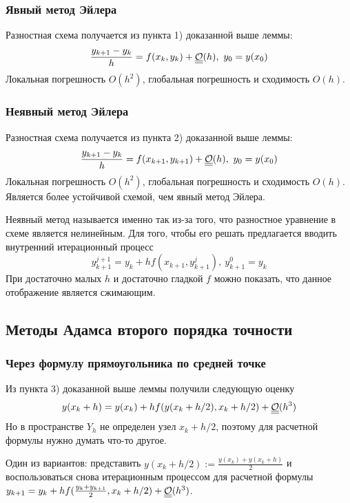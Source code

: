 \subsubsection*{Явный метод Эйлера}
Разностная схема получается из пункта 1) доказанной выше леммы:
\[\frac{y_{k+1}-y_k}{h}= f(x_k,y_k) + \bigO(h),\ y_0=y(x_0)\]
Локальная погрешность $O(h^2)$, глобальная погрешность и сходимость $O(h)$.

\subsubsection*{Неявный метод Эйлера}
Разностная схема получается из пункта 2) доказанной выше леммы:
\[\frac{y_{k+1}-y_k}{h}= f(x_{k+1},y_{k+1}) + \underline{\underline{\mathcal{O}}}(h),\ y_0=y(x_0)\]
Локальная погрешность $O(h^2)$, глобальная погрешность и сходимость $O(h)$.
Является более устойчивой схемой, чем явный метод Эйлера.

Неявный метод называется именно так из-за того, что разностное уравнение
в схеме является нелинейным. Для того, чтобы его решать предлагается
вводить внутренний итерационный процесс
\[y_{k+1}^{j+1}= y_k+hf(x_{k+1},y_{k+1}^{j}),\ y_{k+1}^{0}=y_{k}\]
При достаточно малых $h$ и достаточно гладкой $f$ можно показать,
что данное отображение является сжимающим.

\subsection*{Методы Адамса второго порядка точности}

\subsubsection*{Через формулу прямоугольника по средней точке}
Из пункта 3) доказанной выше леммы получили следующую оценку
\[y(x_k+h)=y(x_k)+hf(y(x_k+h/2), x_k+h/2)+\underline{\underline{\mathcal{O}}}(h^3)\]
Но в пространстве $Y_h$ не определен узел $x_k+h/2$, поэтому
для расчетной формулы нужно думать что-то другое.

Один из вариантов: представить $y(x_k+h/2):=\frac{y(x_k)+y(x_k+h)}{2}$ и
воспользоваться снова итерационным процессом для расчетной
формулы $y_{k+1}=y_{k}+hf(\frac{y_k+y_{k+1}}{2}, x_k+h/2)+\underline{\underline{\mathcal{O}}}(h^3)$.

